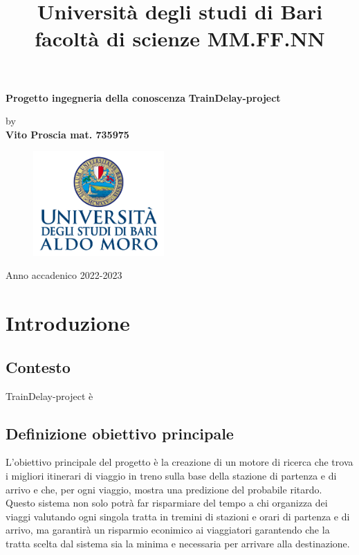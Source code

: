 \documentclass[italian,12pt,a4paper]{article}
\title{Università degli studi di Bari facoltà di scienze MM.FF.NN}
\date{} %
\begin{document}
	\maketitle
	\thispagestyle{empty}
	\begin{center}
		\huge	\textbf{Progetto ingegneria della conoscenza}
		\linebreak
		\linebreak
		\Large \textbf{TrainDelay-project}
	\end{center}
	
	
	
	\begin{center}
		by \\
		\Large \textbf{Vito Proscia mat. 735975}
	\end{center}

	
	\begin{figure}[hb]
		\centering
		\includegraphics[width=5cm]{image.png}
	\end{figure}
	
	\vfill
	\begin{center}
		Anno accadenico 2022-2023
	\end{center}
	
	\newpage
	
	\tableofcontents

	\newpage

	
	\section{Introduzione}

	\subsection{Contesto}
	
	TrainDelay-project è 

	
	\subsection{Definizione obiettivo principale}
	
	L'obiettivo principale del progetto è la creazione di un motore di ricerca che trova i migliori itinerari di viaggio in treno sulla base della stazione di partenza e di arrivo e che, per ogni viaggio, mostra una predizione del probabile ritardo.\\
	Questo sistema non solo potrà far risparmiare del tempo a chi organizza dei viaggi valutando ogni singola tratta in tremini di stazioni e orari di partenza e di arrivo, ma garantirà un risparmio econimico ai viaggiatori garantendo che la tratta scelta dal sistema sia la minima e necessaria per arrivare alla destinazione. 
	
\end{document}
